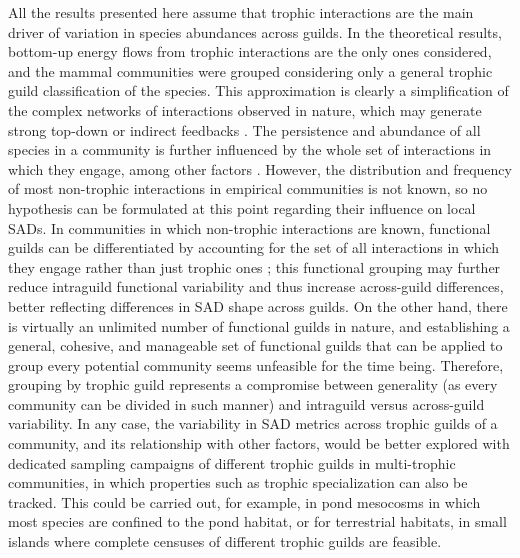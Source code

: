 All the results presented here assume that trophic interactions are the main driver of variation in species abundances across guilds. In the theoretical results, bottom-up energy flows from trophic interactions are the only ones considered, and the mammal communities were grouped considering only a general trophic guild classification of the species. This approximation is clearly a simplification of the complex networks of interactions observed in nature, which may generate strong top-down or indirect feedbacks \citep{Menge1995, Montoya2009a}. The persistence and abundance of all species in a community is further influenced by the whole set of interactions in which they engage, among other factors \citep{Pocock2012, Garcia-Callejas2018a}. However, the distribution and frequency of most non-trophic interactions in empirical communities is not known, so no hypothesis can be formulated at this point regarding their influence on local SADs. In communities in which non-trophic interactions are known, functional guilds can be differentiated by accounting for the set of all interactions in which they engage rather than just trophic ones \citep{Sander2015,Kefi2016a}; this functional grouping may further reduce intraguild functional variability and thus increase across-guild differences, better reflecting differences in SAD shape across guilds. On the other hand, there is virtually an unlimited number of functional guilds in nature, and establishing a general, cohesive, and manageable set of functional guilds that can be applied to group every potential community seems unfeasible for the time being. Therefore, grouping by trophic guild represents a compromise between generality (as every community can be divided in such manner) and intraguild versus across-guild variability. In any case, the variability in SAD metrics across trophic guilds of a community, and its relationship with other factors, would be better explored with dedicated sampling campaigns of different trophic guilds in multi-trophic communities, in which properties such as trophic specialization can also be tracked. This could be carried out, for example, in pond mesocosms in which most species are confined to the pond habitat, or for terrestrial habitats, in small islands where complete censuses of different trophic guilds are feasible.

